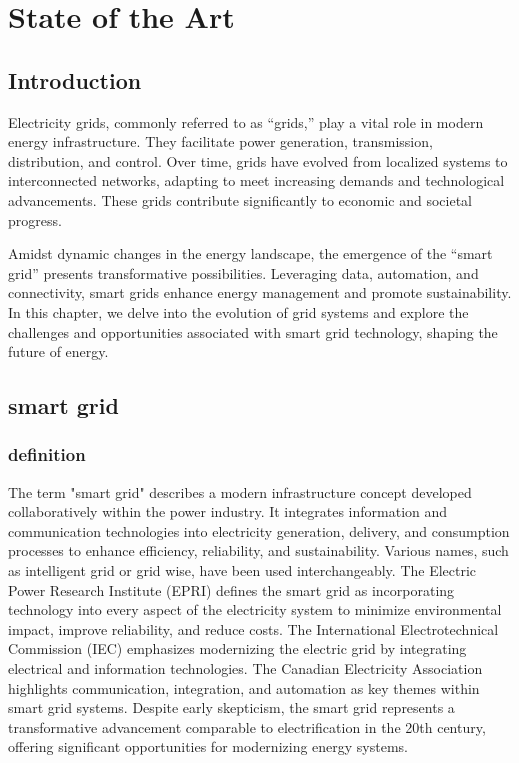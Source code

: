 \chapter{State of the Art} \label{chap:state_of_the_art}


\section*{Introduction}
Electricity grids, commonly referred to as “grids,” play a vital role in modern energy infrastructure. They facilitate power generation, transmission, distribution, and control. Over time, grids have evolved from localized systems to interconnected networks, adapting to meet increasing demands and technological advancements. These grids contribute significantly to economic and societal progress.

Amidst dynamic changes in the energy landscape, the emergence of the “smart grid” presents transformative possibilities. Leveraging data, automation, and connectivity, smart grids enhance energy management and promote sustainability. In this chapter, we delve into the evolution of grid systems and explore the challenges and opportunities associated with smart grid technology, shaping the future of energy.
\newpage


\section{smart grid}
\subsection{definition}
The term "smart grid" describes a modern infrastructure concept developed collaboratively within the power industry. It integrates information and communication technologies into electricity generation, delivery, and consumption processes to enhance efficiency, reliability, and sustainability. Various names, such as intelligent grid or grid wise, have been used interchangeably. The Electric Power Research Institute (EPRI) defines the smart grid as incorporating technology into every aspect of the electricity system to minimize environmental impact, improve reliability, and reduce costs. The International Electrotechnical Commission (IEC) emphasizes modernizing the electric grid by integrating electrical and information technologies. The Canadian Electricity Association highlights communication, integration, and automation as key themes within smart grid systems. Despite early skepticism, the smart grid represents a transformative advancement comparable to electrification in the 20th century, offering significant opportunities for modernizing energy systems.\cite{bar73}
